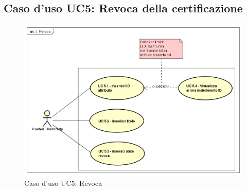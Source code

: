 \subsection{Caso d'uso UC5: Revoca della certificazione}
\begin{figure}[h]
	\centering
	\includegraphics[scale=0.50]{immagini/usecase/UC5_Revoca}
	\caption{Caso d'uso UC5: Revoca}
\end{figure}

